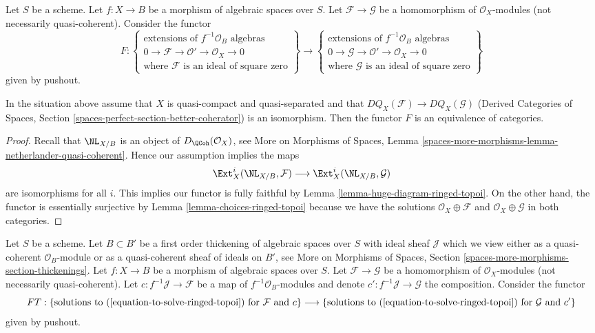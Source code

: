 \noindent
Let $S$ be a scheme. Let $f : X \to B$
be a morphism of algebraic spaces over $S$.
Let $\mathcal{F} \to \mathcal{G}$ be a homomorphism of $\mathcal{O}_X$-modules
(not necessarily quasi-coherent).
Consider the functor
$$
F :
\left\{
\begin{matrix}
\text{extensions of }f^{-1}\mathcal{O}_B\text{ algebras}\\
0 \to \mathcal{F} \to \mathcal{O}' \to \mathcal{O}_X \to 0\\
\text{where }\mathcal{F}\text{ is an ideal of square zero}
\end{matrix}
\right\}
\longrightarrow
\left\{
\begin{matrix}
\text{extensions of }f^{-1}\mathcal{O}_B\text{ algebras}\\
0 \to \mathcal{G} \to \mathcal{O}' \to \mathcal{O}_X \to 0\\
\text{where }\mathcal{G}\text{ is an ideal of square zero}
\end{matrix}
\right\}
$$
given by pushout.

\begin{lemma}
\label{lemma-thickening-space-quasi-coherent}
In the situation above assume that $X$ is quasi-compact and quasi-separated
and that $DQ_X(\mathcal{F}) \to DQ_X(\mathcal{G})$
(Derived Categories of Spaces, Section
\ref{spaces-perfect-section-better-coherator})
is an isomorphism. Then the functor $F$ is an equivalence of categories.
\end{lemma}

\begin{proof}
Recall that $\NL_{X/B}$ is an object of $D_\QCoh(\mathcal{O}_X)$, see
More on Morphisms of Spaces, Lemma
\ref{spaces-more-morphisms-lemma-netherlander-quasi-coherent}.
Hence our assumption implies the maps
$$
\Ext^i_X(\NL_{X/B}, \mathcal{F}) \longrightarrow
\Ext^i_X(\NL_{X/B}, \mathcal{G})
$$
are isomorphisms for all $i$. This implies our functor is fully
faithful by Lemma \ref{lemma-huge-diagram-ringed-topoi}.
On the other hand, the functor is essentially surjective by
Lemma \ref{lemma-choices-ringed-topoi} because
we have the solutions $\mathcal{O}_X \oplus \mathcal{F}$
and $\mathcal{O}_X \oplus \mathcal{G}$ in both categories.
\end{proof}

\noindent
Let $S$ be a scheme. Let $B \subset B'$ be a first order thickening of
algebraic spaces over $S$ with ideal sheaf $\mathcal{J}$
which we view either as a quasi-coherent $\mathcal{O}_B$-module
or as a quasi-coherent sheaf of ideals on $B'$, see
More on Morphisms of Spaces, Section
\ref{spaces-more-morphisms-section-thickenings}.
Let $f : X \to B$ be a morphism of algebraic spaces over $S$.
Let $\mathcal{F} \to \mathcal{G}$ be a homomorphism of
$\mathcal{O}_X$-modules (not necessarily quasi-coherent).
Let $c : f^{-1}\mathcal{J} \to \mathcal{F}$ be a map
of $f^{-1}\mathcal{O}_B$-modules and denote
$c' : f^{-1}\mathcal{J} \to \mathcal{G}$ the composition.
Consider the functor
$$
FT :
\{\text{solutions to }(\ref{equation-to-solve-ringed-topoi})
\text{ for }\mathcal{F}\text{ and }c\}
\longrightarrow
\{\text{solutions to }(\ref{equation-to-solve-ringed-topoi})
\text{ for }\mathcal{G}\text{ and }c'\}
$$
given by pushout.


